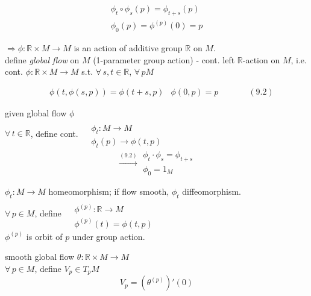 \documentclass[11pt]{amsart}
\theoremstyle{definition}
\begin{document}
\[
\begin{gathered}
  \phi_t \circ \phi_s(p) = \phi_{t+s}(p) \\
  \phi_0(p) = \phi^{(p)}(0) = p
\end{gathered}
\]

$\Longrightarrow \phi : \mathbb{R}\times M \to M$ is an action of additive group $\mathbb{R}$ on $M$.  \\

define \emph{ global flow } on $M$ (1-parameter group action) - cont. left $\mathbb{R}$-action on $M$, i.e. \\
\quad cont. $\phi : \mathbb{R} \times M \to M$ s.t. $\forall \, s,t \in \mathbb{R}$, $\forall \, p M$

\begin{equation}
\begin{aligned}
& \phi(t, \phi(s,p) ) = \phi(t+s, p )
& \phi(0,p) = p
\end{aligned} \quad \quad \quad \, (9.2)
\end{equation}

given global flow $\phi$ \\

$\forall \, t \in \mathbb{R}$, define cont. $\begin{aligned} & \quad \\
  & \phi_t: M \to M \\
  & \phi_t(p) \to \phi(t,p)
\end{aligned}$
\[
\xrightarrow{ (9.2) } \begin{gathered}
  \phi_t \cdot \phi_s = \phi_{t+s} \\
  \phi_0 = 1_M
\end{gathered}
\]

$\phi_t : M \to M$ homeomorphism; if flow smooth, $\phi_t$ diffeomorphism.   \\

$\forall \, p \in M$, define $ \begin{aligned} & \quad \\ & \phi^{(p)}:\mathbb{R} \to M \\ & \phi^{(p)}(t) = \phi(t,p) \end{aligned}$ \\

$\phi^{(p)}$ is orbit of $p$ under group action.

smooth global flow $\theta:\mathbb{R} \times M \to M$ \\
\quad $\forall \, p \in M$, define $V_p \in T_pM$
\[
V_p = (\theta^{(p)})'(0)
\]
\end{document}
